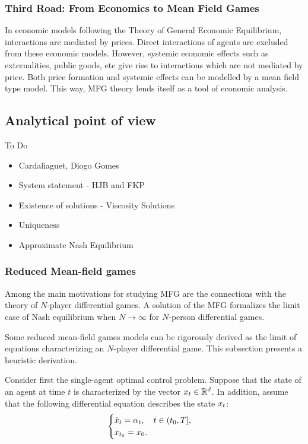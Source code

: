 \documentclass{article}
\begin{document}
\subsubsection{Third Road: From Economics to Mean Field Games}
In economic models following the Theory of General Economic Equilibrium, interactions are mediated by prices. Direct interactions of agents are excluded from these economic models. However, systemic economic effects such as externalities, public goods, etc give rise to interactions which are not mediated by price. Both price formation and systemic effects can be modelled by a mean field type model. This way, MFG theory lends itself as a tool of economic analysis.




\subsection{Analytical point of view}



To Do
\begin{itemize}
    \item Cardaliaguet, Diogo Gomes
    \item System statement - HJB and FKP
    \item Existence of solutions - Viscosity Solutions
    \item Uniqueness
    \item Approximate Nash Equilibrium
\end{itemize}

\subsubsection{Reduced Mean-field games}\label{reduced_mfg}
Among the main motivations for studying MFG are the connections with
 the theory of $N$-player differential games. A solution of the MFG formalizes 
 the limit case of Nash equilibrium when $N \to \infty$ for $N$-person differential games.

Some reduced mean-field games models can be rigorously derived as the limit 
of equations characterizing an $N$-player differential game. This subsection presents a heuristic derivation.

Consider first the single-agent optimal control problem.
Suppose that the state of an agent at time $t$ is characterized by the vector 
$x_t \in \mathbb{R}^d$.
In addition, assume that the following differential equation describes the state $x_t$:
\begin{equation}\label{reduced_mfg:state_evolution}
\begin{cases}
\dot{ x}_t = {\alpha}_t,\quad t\in (t_0,T],\\ {x}_{t_0} = x_0.
\end{cases}
\end{equation}
\end{document}
